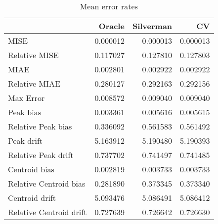 \begin{table}[H]
\centering
\begin{tabular}{lrrr}
  \hline
 & Oracle & Silverman & CV \\ 
  \hline
MISE & 0.000012 & 0.000013 & 0.000013 \\ 
  Relative MISE & 0.117027 & 0.127810 & 0.127803 \\ 
  MIAE & 0.002801 & 0.002922 & 0.002922 \\ 
  Relative MIAE & 0.280127 & 0.292163 & 0.292156 \\ 
  Max Error & 0.008572 & 0.009040 & 0.009040 \\ 
  Peak bias & 0.003361 & 0.005616 & 0.005615 \\ 
  Relative Peak bias & 0.336092 & 0.561583 & 0.561492 \\ 
  Peak drift & 5.163912 & 5.190480 & 5.190393 \\ 
  Relative Peak drift & 0.737702 & 0.741497 & 0.741485 \\ 
  Centroid bias & 0.002819 & 0.003733 & 0.003733 \\ 
  Relative Centroid bias & 0.281890 & 0.373345 & 0.373340 \\ 
  Centroid drift & 5.093476 & 5.086491 & 5.086412 \\ 
  Relative Centroid drift & 0.727639 & 0.726642 & 0.726630 \\ 
   \hline
\end{tabular}
\caption{Mean error rates} 
\label{tbl:mean_error_rates}
\end{table}
